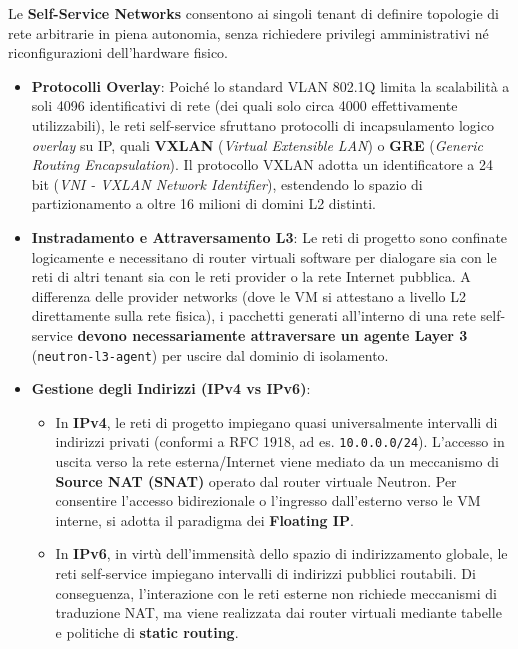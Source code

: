 \documentclass[11pt, a4paper]{article}
\begin{document}
Le \textbf{Self-Service Networks} consentono ai singoli tenant di definire topologie di rete arbitrarie in piena autonomia, senza richiedere privilegi amministrativi né riconfigurazioni dell'hardware fisico.
\begin{itemize}
    \item \textbf{Protocolli Overlay}: Poiché lo standard VLAN 802.1Q limita la scalabilità a soli 4096 identificativi di rete (dei quali solo circa 4000 effettivamente utilizzabili), le reti self-service sfruttano protocolli di incapsulamento logico \emph{overlay} su IP, quali \textbf{VXLAN} (\emph{Virtual Extensible LAN}) o \textbf{GRE} (\emph{Generic Routing Encapsulation}). Il protocollo VXLAN adotta un identificatore a 24 bit (\emph{VNI - VXLAN Network Identifier}), estendendo lo spazio di partizionamento a oltre 16 milioni di domini L2 distinti.
    \item \textbf{Instradamento e Attraversamento L3}: Le reti di progetto sono confinate logicamente e necessitano di router virtuali software per dialogare sia con le reti di altri tenant sia con le reti provider o la rete Internet pubblica. A differenza delle provider networks (dove le VM si attestano a livello L2 direttamente sulla rete fisica), i pacchetti generati all'interno di una rete self-service \textbf{devono necessariamente attraversare un agente Layer 3} (\texttt{neutron-l3-agent}) per uscire dal dominio di isolamento.
    \item \textbf{Gestione degli Indirizzi (IPv4 vs IPv6)}:
    \begin{itemize}[noitemsep]
        \item In \textbf{IPv4}, le reti di progetto impiegano quasi universalmente intervalli di indirizzi privati (conformi a RFC 1918, ad es. \texttt{10.0.0.0/24}). L'accesso in uscita verso la rete esterna/Internet viene mediato da un meccanismo di \textbf{Source NAT (SNAT)} operato dal router virtuale Neutron. Per consentire l'accesso bidirezionale o l'ingresso dall'esterno verso le VM interne, si adotta il paradigma dei \textbf{Floating IP}.
        \item In \textbf{IPv6}, in virtù dell'immensità dello spazio di indirizzamento globale, le reti self-service impiegano intervalli di indirizzi pubblici routabili. Di conseguenza, l'interazione con le reti esterne non richiede meccanismi di traduzione NAT, ma viene realizzata dai router virtuali mediante tabelle e politiche di \textbf{static routing}.
    \end{itemize}
\end{itemize}
\end{document}
